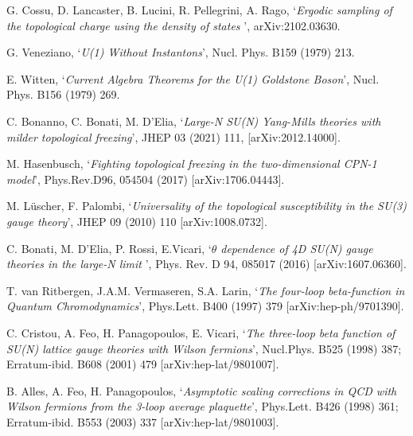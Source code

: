 \documentclass[12pt]{article}
\begin{document}
\begin{thebibliography}{99}
   
  G. Cossu, D. Lancaster, B. Lucini, R. Pellegrini, A. Rago,
  `{\it Ergodic sampling of the topological charge using the density of states }',
  arXiv:2102.03630.

  G. Veneziano,
  `{\it U(1) Without Instantons}',
  Nucl. Phys. B159 (1979) 213.
  
  E. Witten,
  `{\it Current Algebra Theorems for the U(1) Goldstone Boson}',
  Nucl. Phys. B156 (1979) 269.


  C. Bonanno, C. Bonati, M. D'Elia,
  `{\it Large-N SU(N) Yang-Mills theories with milder topological freezing}',
  JHEP 03 (2021) 111, [arXiv:2012.14000].

  
  M. Hasenbusch,
  `{\it  Fighting topological freezing in the two-dimensional CPN-1 model}',
  Phys.Rev.D96, 054504 (2017) [arXiv:1706.04443].

  M. L\"uscher, F. Palombi,
  `{\it Universality of the topological susceptibility in the SU(3) gauge theory}',
  JHEP 09 (2010) 110 [arXiv:1008.0732].


  C. Bonati, M. D'Elia, P. Rossi, E.Vicari,
  `{\it $\theta$  dependence of 4D SU(N) gauge theories in the large-N limit }',
  Phys. Rev. D 94, 085017 (2016) [arXiv:1607.06360].

  
  T. van Ritbergen, J.A.M. Vermaseren, S.A. Larin,
  `{\it The four-loop beta-function in Quantum Chromodynamics}',
  Phys.Lett. B400 (1997) 379 [arXiv:hep-ph/9701390].

  C. Cristou, A. Feo, H. Panagopoulos, E. Vicari,
  `{\it The three-loop beta function of SU(N) lattice gauge theories with Wilson fermions}',
  Nucl.Phys. B525 (1998) 387; Erratum-ibid. B608 (2001) 479 [arXiv:hep-lat/9801007].

  B. Alles, A. Feo, H. Panagopoulos,
  `{\it Asymptotic scaling corrections in QCD with Wilson fermions from the 3-loop
    average plaquette}',
  Phys.Lett. B426 (1998) 361; Erratum-ibid. B553 (2003) 337 [arXiv:hep-lat/9801003].

 
  
\end{thebibliography}



\clearpage
\end{document}
